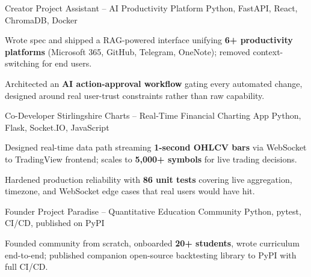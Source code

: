

\begin{cventries}

  \cventry
    {Creator} %
    {Project Assistant -- AI Productivity Platform} %
    {Python, FastAPI, React, ChromaDB, Docker} %
    {} %
    {
      \begin{cvitems}
        \item {Wrote spec and shipped a RAG-powered interface unifying \textbf{6+ productivity platforms} (Microsoft 365, GitHub, Telegram, OneNote); removed context-switching for end users.}
        \item {Architected an \textbf{AI action-approval workflow} gating every automated change, designed around real user-trust constraints rather than raw capability.}
      \end{cvitems}
    }

  \cventry
    {Co-Developer} %
    {Stirlingshire Charts -- Real-Time Financial Charting App} %
    {Python, Flask, Socket.IO, JavaScript} %
    {} %
    {
      \begin{cvitems}
        \item {Designed real-time data path streaming \textbf{1-second OHLCV bars} via WebSocket to TradingView frontend; scales to \textbf{5,000+ symbols} for live trading decisions.}
        \item {Hardened production reliability with \textbf{86 unit tests} covering live aggregation, timezone, and WebSocket edge cases that real users would have hit.}
      \end{cvitems}
    }

  \cventry
    {Founder} %
    {Project Paradise -- Quantitative Education Community} %
    {Python, pytest, CI/CD, published on PyPI} %
    {} %
    {
      \begin{cvitems}
        \item {Founded community from scratch, onboarded \textbf{20+ students}, wrote curriculum end-to-end; published companion open-source backtesting library to PyPI with full CI/CD.}
      \end{cvitems}
    }

\end{cventries}
